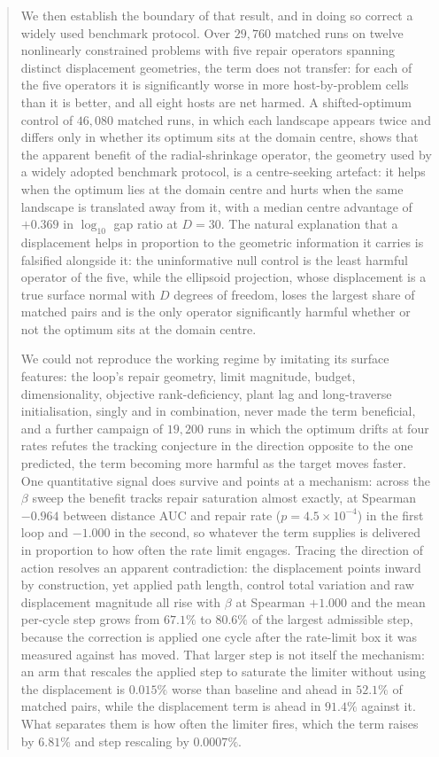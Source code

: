 \documentclass[11pt,a4paper]{article}
\begin{document}
\begin{abstract}
We then establish the boundary of that result, and in doing so correct a widely used
benchmark protocol. Over $29{,}760$ matched runs on twelve nonlinearly constrained problems
with five repair operators spanning distinct displacement geometries, the term does not
transfer: for each of the five operators it is significantly worse in more host-by-problem
cells than it is better, and all eight hosts are net harmed. A shifted-optimum control of
$46{,}080$ matched runs, in which each landscape appears twice and differs only in whether
its optimum sits at the domain centre, shows that the apparent benefit of the
radial-shrinkage operator, the geometry used by a widely adopted benchmark protocol, is a
centre-seeking artefact: it helps when the optimum lies at the domain centre and hurts
when the same landscape is translated away from it, with a median centre advantage of
$+0.369$ in $\log_{10}$ gap ratio at $D=30$. The natural explanation that a displacement
helps in proportion to the geometric information it carries is falsified alongside it: the
uninformative null control is the least harmful operator of the five, while the ellipsoid
projection, whose displacement is a true surface normal with $D$ degrees of freedom, loses
the largest share of matched pairs and is the only operator significantly harmful whether
or not the optimum sits at the domain centre.

We could not reproduce the working regime by imitating its surface features: the loop's
repair geometry, limit magnitude, budget, dimensionality, objective rank-deficiency, plant
lag and long-traverse initialisation, singly and in combination, never made the term
beneficial, and a further campaign of $19{,}200$ runs in which the optimum drifts at four
rates refutes the tracking conjecture in the direction opposite to the one predicted, the
term becoming more harmful as the target moves faster. One quantitative signal does
survive and points at a mechanism: across the $\beta$ sweep the benefit tracks repair
saturation almost exactly, at Spearman $-0.964$ between distance AUC and repair rate
($p = 4.5 \times 10^{-4}$) in the first loop and $-1.000$ in the second, so whatever the term
supplies is delivered in proportion to how often the rate limit engages. Tracing the
direction of action resolves an apparent contradiction: the displacement points inward by
construction, yet applied path length, control total variation and raw displacement
magnitude all rise with $\beta$ at Spearman $+1.000$ and the mean per-cycle step grows from
$67.1\%$ to $80.6\%$ of the largest admissible step, because the correction is applied one
cycle after the rate-limit box it was measured against has moved. That larger step is not
itself the mechanism: an arm that rescales the applied step to saturate the limiter without
using the displacement is $0.015\%$ worse than baseline and ahead in $52.1\%$ of matched
pairs, while the displacement term is ahead in $91.4\%$ against it. What separates them is
how often the limiter fires, which the term raises by $6.81\%$ and step rescaling by
$0.0007\%$.


\end{abstract}
\end{document}
